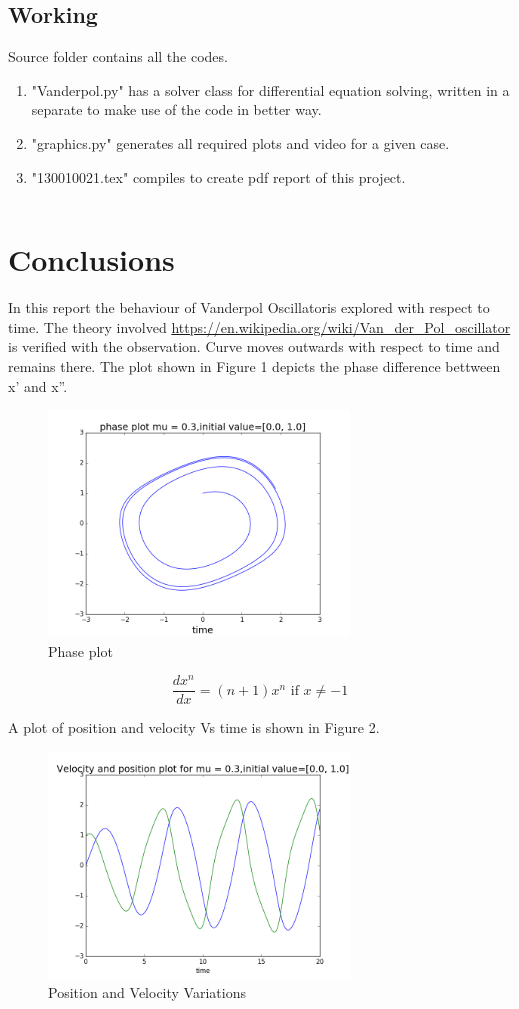 \documentclass[a4paper]{article}
\begin{document}
\subsection{Working}
Source folder contains all the codes. 
\begin{enumerate}
\item "Vanderpol.py" has a solver class for differential equation solving, written in a separate to make use of the code in better way.
\item "graphics.py" generates all required plots and video for a given case. 
\item "130010021.tex" compiles to create pdf report of this project.
\end{enumerate}
\begin{verbatim}
\end{verbatim}

\section{Conclusions}
In this report the behaviour of Vanderpol Oscillatoris explored with respect to time. The theory involved \url{https://en.wikipedia.org/wiki/Van_der_Pol_oscillator} is verified with the observation. Curve moves outwards with respect to time and remains there. The plot shown in Figure 1 depicts the phase difference bettween x' and x''.

\begin{figure}[!htbp]
\begin{center}
\includegraphics[width=8cm]{../output/phase_plot.png}
\end{center}
\caption{Phase plot}\label{lines}
\end{figure}

$$\frac{dx^n}{dx}=(n+1)x^{n}\text{ if }x\ne-1$$

A plot of position and velocity Vs time is shown in Figure 2.

\begin{figure}[!htbp]
\begin{center}
\includegraphics[width=8cm]{../output/position_velocity.png}
\end{center}
\caption{Position and Velocity Variations}\label{pos}
\end{figure}



\end{document}
